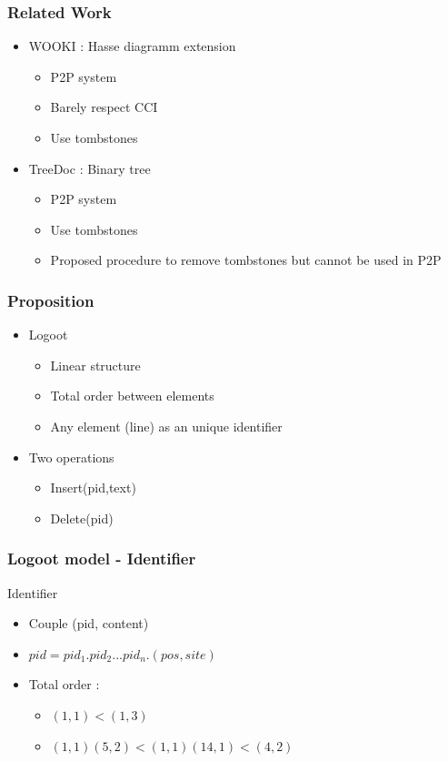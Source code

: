 \documentclass[14pt]{beamer}
\begin{document}
	\begin{frame}
	  \frametitle{Related Work}
		\begin{itemize}
			\item<1-> WOOKI : Hasse diagramm extension
			\begin{itemize}
				\item<1-> P2P system
				\item<1-> Barely respect CCI
				\item<1-> Use tombstones
			\end{itemize}
			\item<2-> TreeDoc : Binary tree
			\begin{itemize}
				\item<2-> P2P system
				\item<2-> Use tombstones
				\item<2-> Proposed procedure to remove tombstones but cannot be used in P2P
			\end{itemize}			
		\end{itemize}
	\end{frame}

	\begin{frame}
		\frametitle{Proposition}
		\begin{itemize}
			\item Logoot
			\begin{itemize}
				\item Linear structure
				\item Total order between elements
				\item Any element (line) as an unique identifier
			\end{itemize}
			\item Two operations
			\begin{itemize}
				\item Insert(pid,text)
				\item Delete(pid)
			\end{itemize}
		\end{itemize}
	\end{frame}

	\begin{frame}
		\frametitle{Logoot model - Identifier}
		Identifier
		\begin{itemize}
			\item Couple (pid, content)
			\item $pid=pid_1.pid_2...pid_n.(pos, site)$
			\item Total order :
				\begin{itemize}
					\item $(1,1) < (1,3)$
					\item $(1,1)(5,2) < (1,1)(14,1) < (4,2) $
				\end{itemize}
		\end{itemize}		
	\end{frame}
\end{document}

